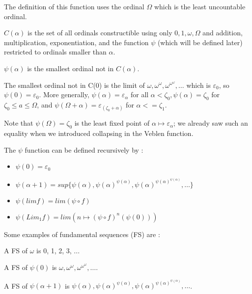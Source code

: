\documentclass[10pt]{article}
\begin{document}
The definition of this function uses the ordinal \( \Omega \) which is the least uncountable ordinal. 

\( C(\alpha) \) is the set of all ordinals constructible using only \( 0, 1, \omega, \Omega \) and addition, multiplication, exponentiation, and the function \( \psi \) (which will be defined later) restricted to ordinals smaller than \( \alpha \).

\( \psi(\alpha) \) is the smallest ordinal not in \( C(\alpha) \). 

The smallest ordinal not in C(0) is the limit of \( \omega, \omega^\omega, \omega^{\omega^\omega}, \ldots \) which is \( \varepsilon_0 \), so \( \psi(0) = \varepsilon_0 \). More generally, \( \psi(\alpha) = \varepsilon_\alpha \) for all \( \alpha < \zeta_0, \psi(\alpha) = \zeta_0 \) for \( \zeta_0 \leq a \leq \Omega \), and \( \psi(\Omega+\alpha) = \varepsilon_(\zeta_0+\alpha) \) for \( \alpha <= \zeta_1 \). 

Note that \( \psi(\Omega) = \zeta_0 \) is the least fixed point of \( \alpha \mapsto \varepsilon_\alpha \); we already saw such an equality when we introduced collapsing in the Veblen function.

The \( \psi \) function can be defined recursively by :

\begin{itemize}
     \setlength{\itemsep}{1pt}
     \setlength{\parskip}{0pt}
     \setlength{\parsep}{0pt}

\item \( \psi(0) = \varepsilon_0 \)

\item \( \psi(\alpha+1) = sup \lbrace \psi(\alpha), \psi(\alpha)^{\psi(\alpha)}, \psi(\alpha)^{\psi(\alpha)^{\psi(\alpha)}}, \ldots \rbrace \)

\item \( \psi(lim f) = lim (\psi \circ f) \)

\item \( \psi(Lim_1 f) = lim (n \mapsto (\psi \circ f)^n (\psi(0))) \)

\end{itemize}

Some examples of fundamental sequences (FS) are :

A FS of \( \omega \) is 0, 1, 2, 3, ...

A FS of \( \psi(0) \) is \( \omega, \omega^\omega, \omega^{\omega^\omega}, \ldots \).

A FS of \( \psi(\alpha+1) \) is \( \psi(\alpha), \psi(\alpha)^{\psi(\alpha)}, \psi(\alpha)^{\psi(\alpha)^{\psi(\alpha)}}, \ldots \).
\end{document}
